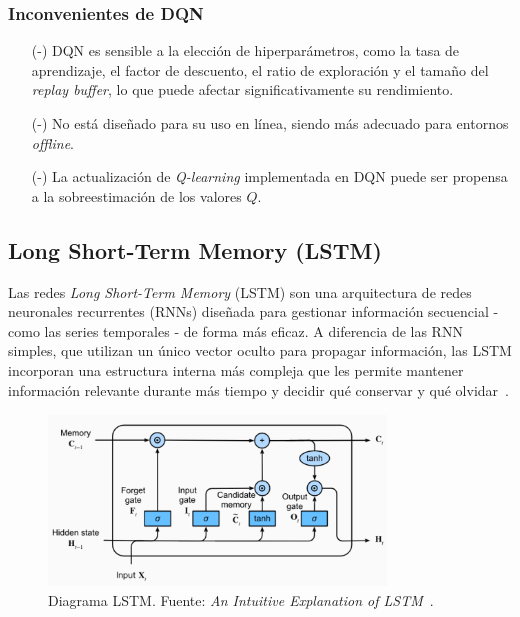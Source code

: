 \subsubsection{Inconvenientes de DQN \cite{dhumne2019dqn}}
\begin{itemize}
    \item[(-)] DQN es sensible a la elección de hiperparámetros, como la tasa de aprendizaje, el 
    factor de descuento, el ratio de exploración y el tamaño del \textit{replay buffer}, lo que 
    puede afectar significativamente su rendimiento.
    \item[(-)] No está diseñado para su uso en línea, siendo más adecuado para entornos 
    \textit{offline}.
    \item[(-)] La actualización de \textit{Q-learning} implementada en DQN puede ser propensa a la 
    sobreestimación de los valores \( Q \).
\end{itemize}

\subsection{Long Short-Term Memory (LSTM)}
Las redes \textit{Long Short-Term Memory} (LSTM) son una arquitectura de redes neuronales 
recurrentes (RNNs) diseñada para gestionar información secuencial - como las series temporales - de 
forma más eficaz. A diferencia de las RNN simples, que utilizan un único vector oculto para 
propagar información, las LSTM incorporan una estructura interna más compleja que les permite 
mantener información relevante durante más tiempo y decidir qué conservar y qué 
olvidar~\cite{bulling2024rnn}.

\begin{figure}[ht]
    \centering
    \includegraphics[width=0.8\textwidth]{images/LSTM_diagram.png}
    \caption{Diagrama LSTM. Fuente: \textit{An Intuitive Explanation of LSTM}~\cite{calzone2020lstm}.}
    \label{fig:lstm_diagram}
\end{figure}

